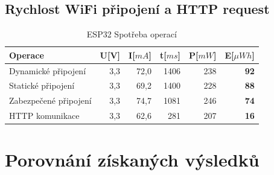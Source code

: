 \documentclass[a4paper, 12pt]{report}
\begin{document}
    \subsection{Rychlost WiFi připojení a HTTP request}
    \begin{table}[h]
        \centering
        \caption{ESP32 Spotřeba operací}
        \begin{tabular}{||l| r r r r |r||}
            \hline
            Operace               & U[V] & I[$mA$] & t[$ms$] & P[$mW$] & \textbf{E}[$\mu Wh$] \\
            \hline
            \hline
            Dynamické připojení   & 3,3  & 72,0    & 1406  & 238     & \textbf{92}          \\
            Statické připojení    & 3,3  & 69,2    & 1400  & 228     & \textbf{88}          \\
            Zabezpečené připojení & 3,3  & 74,7    & 1081  & 246     & \textbf{74}          \\
            HTTP komunikace       & 3,3  & 62,6    & 281   & 207     & \textbf{16}          \\
            \hline
        \end{tabular}
        \label{tab:esp32-spotreba-operaci}
    \end{table}

    \section{Porovnání získaných výsledků}
\end{document}
